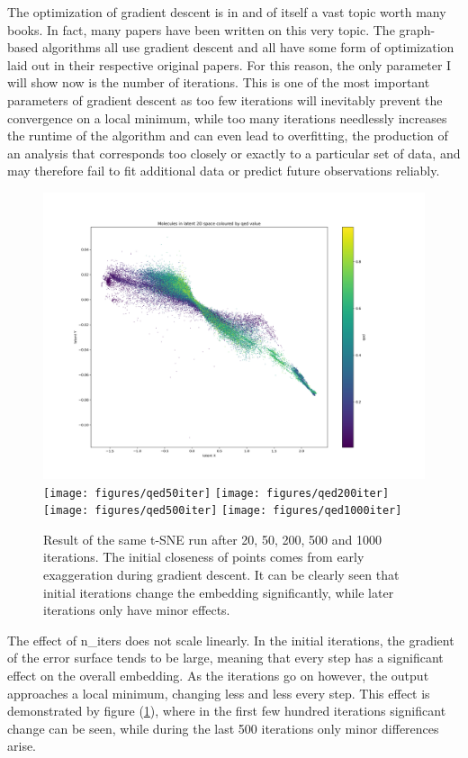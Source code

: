 The optimization of gradient descent is in and of itself a vast topic worth many books. In fact, many papers have been written on this very topic. The graph-based algorithms all use gradient descent and all have some form of optimization laid out in their respective original papers. For this reason, the only parameter I will show now is the number of iterations. This is one of the most important parameters of gradient descent as too few iterations will inevitably prevent the convergence on a local minimum, while too many iterations needlessly increases the runtime of the algorithm and can even lead to overfitting, the production of an analysis that corresponds too closely or exactly to a particular set of data, and may therefore fail to fit additional data or predict future observations reliably.

\begin{figure}[!h]
	\centering
	\includegraphics[scale=0.1]{figures/qed20iter}
	\texttt{[image: figures/qed50iter]}
	\texttt{[image: figures/qed200iter]}
	\texttt{[image: figures/qed500iter]}
	\texttt{[image: figures/qed1000iter]}
	\caption{Result of the same t-SNE run after 20, 50, 200, 500 and 1000 iterations. The initial closeness of points comes from early exaggeration during gradient descent. It can be clearly seen that initial iterations change the embedding significantly, while later iterations only have minor effects.}
	\label{fig:tsne:iter_sweep}
\end{figure}

The effect of n\_iters does not scale linearly. In the initial iterations, the gradient of the error surface tends to be large, meaning that every step has a significant effect on the overall embedding. As the iterations go on however, the output approaches a local minimum, changing less and less every step. This effect is demonstrated by figure (\ref{fig:tsne:iter_sweep}), where in the first few hundred iterations significant change can be seen, while during the last 500 iterations only minor differences arise.

